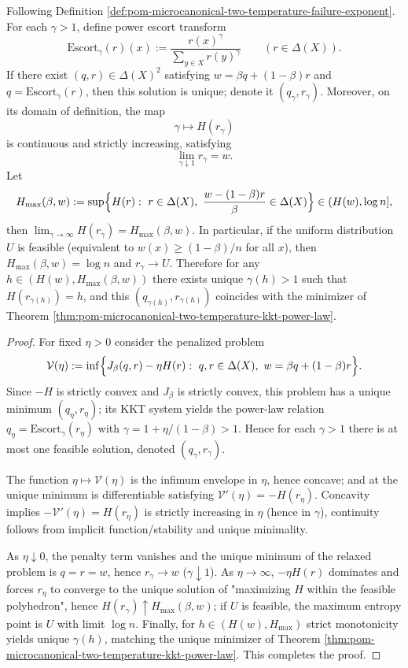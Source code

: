 \begin{proposition}\label{prop:pom-microcanonical-two-temperature-escort-orbit-entropy-monotone}
Following Definition \ref{def:pom-microcanonical-two-temperature-failure-exponent}.
For each \(\gamma>1\), define power escort transform
\[
\mathrm{Escort}_\gamma(r)(x):=\frac{r(x)^\gamma}{\sum_{y\in X}r(y)^\gamma}\qquad(r\in\Delta(X)).
\]
If there exist \((q,r)\in\Delta(X)^2\) satisfying \(w=\beta q+(1-\beta)r\) and \(q=\mathrm{Escort}_\gamma(r)\), then this solution is unique; denote it \((q_\gamma,r_\gamma)\).
Moreover, on its domain of definition, the map
\[
\gamma\longmapsto H(r_\gamma)
\]
is continuous and strictly increasing, satisfying
\[
\lim_{\gamma\downarrow 1}r_\gamma=w.
\]
Let
\[
H_{\max}(\beta,w):=\sup\Bigl\{H(r):\ r\in\Delta(X),\ \frac{w-(1-\beta)r}{\beta}\in\Delta(X)\Bigr\}\in(H(w),\log n],
\]
then \(\lim_{\gamma\to\infty}H(r_\gamma)=H_{\max}(\beta,w)\).
In particular, if the uniform distribution \(U\) is feasible (equivalent to \(w(x)\ge (1-\beta)/n\) for all \(x\)), then \(H_{\max}(\beta,w)=\log n\) and \(r_\gamma\to U\).
Therefore for any \(h\in(H(w),H_{\max}(\beta,w))\) there exists unique \(\gamma(h)>1\) such that \(H(r_{\gamma(h)})=h\), and this \((q_{\gamma(h)},r_{\gamma(h)})\) coincides with the minimizer of Theorem \ref{thm:pom-microcanonical-two-temperature-kkt-power-law}.
\end{proposition}
\begin{proof}
For fixed \(\eta>0\) consider the penalized problem
\[
\mathcal{V}(\eta):=\inf\Bigl\{J_\beta(q,r)-\eta H(r):\ q,r\in\Delta(X),\ w=\beta q+(1-\beta)r\Bigr\}.
\]
Since \(-H\) is strictly convex and \(J_\beta\) is strictly convex, this problem has a unique minimum \((q_\eta,r_\eta)\);
its KKT system yields the power-law relation \(q_\eta=\mathrm{Escort}_\gamma(r_\eta)\) with \(\gamma=1+\eta/(1-\beta)>1\).
Hence for each \(\gamma>1\) there is at most one feasible solution, denoted \((q_\gamma,r_\gamma)\).
\par
The function \(\eta\mapsto \mathcal{V}(\eta)\) is the infimum envelope in \(\eta\), hence concave; and at the unique minimum is differentiable satisfying
\(
\mathcal{V}'(\eta)=-H(r_\eta)
\).
Concavity implies \(-\mathcal{V}'(\eta)=H(r_\eta)\) is strictly increasing in \(\eta\) (hence in \(\gamma\)), continuity follows from implicit function/stability and unique minimality.
\par
As \(\eta\downarrow 0\), the penalty term vanishes and the unique minimum of the relaxed problem is \(q=r=w\), hence \(r_\gamma\to w\) (\(\gamma\downarrow 1\)).
As \(\eta\to\infty\), \(-\eta H(r)\) dominates and forces \(r_\eta\) to converge to the unique solution of "maximizing \(H\) within the feasible polyhedron", hence \(H(r_\gamma)\uparrow H_{\max}(\beta,w)\);
if \(U\) is feasible, the maximum entropy point is \(U\) with limit \(\log n\).
Finally, for \(h\in(H(w),H_{\max})\) strict monotonicity yields unique \(\gamma(h)\), matching the unique minimizer of Theorem \ref{thm:pom-microcanonical-two-temperature-kkt-power-law}. This completes the proof.
\end{proof}


